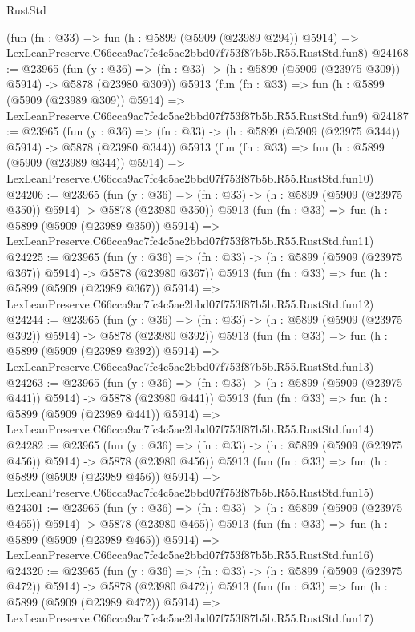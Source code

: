 \begin{lexlean}{RustStd}
\begin{coremodule}
{{    (fun (fn : @33) =>
    fun (h : @5899 (@5909 (@23989 @294)) @5914) =>
    LexLeanPreserve.C66cca9ac7fc4c5ae2bbd07f753f87b5b.R55.RustStd.fun8)
@24168 := @23965
    (fun (y : @36) => (fn : @33) -> (h : @5899 (@5909 (@23975 @309)) @5914) -> @5878 (@23980 @309))
    @5913
    (fun (fn : @33) =>
    fun (h : @5899 (@5909 (@23989 @309)) @5914) =>
    LexLeanPreserve.C66cca9ac7fc4c5ae2bbd07f753f87b5b.R55.RustStd.fun9)
@24187 := @23965
    (fun (y : @36) => (fn : @33) -> (h : @5899 (@5909 (@23975 @344)) @5914) -> @5878 (@23980 @344))
    @5913
    (fun (fn : @33) =>
    fun (h : @5899 (@5909 (@23989 @344)) @5914) =>
    LexLeanPreserve.C66cca9ac7fc4c5ae2bbd07f753f87b5b.R55.RustStd.fun10)
@24206 := @23965
    (fun (y : @36) => (fn : @33) -> (h : @5899 (@5909 (@23975 @350)) @5914) -> @5878 (@23980 @350))
    @5913
    (fun (fn : @33) =>
    fun (h : @5899 (@5909 (@23989 @350)) @5914) =>
    LexLeanPreserve.C66cca9ac7fc4c5ae2bbd07f753f87b5b.R55.RustStd.fun11)
@24225 := @23965
    (fun (y : @36) => (fn : @33) -> (h : @5899 (@5909 (@23975 @367)) @5914) -> @5878 (@23980 @367))
    @5913
    (fun (fn : @33) =>
    fun (h : @5899 (@5909 (@23989 @367)) @5914) =>
    LexLeanPreserve.C66cca9ac7fc4c5ae2bbd07f753f87b5b.R55.RustStd.fun12)
@24244 := @23965
    (fun (y : @36) => (fn : @33) -> (h : @5899 (@5909 (@23975 @392)) @5914) -> @5878 (@23980 @392))
    @5913
    (fun (fn : @33) =>
    fun (h : @5899 (@5909 (@23989 @392)) @5914) =>
    LexLeanPreserve.C66cca9ac7fc4c5ae2bbd07f753f87b5b.R55.RustStd.fun13)
@24263 := @23965
    (fun (y : @36) => (fn : @33) -> (h : @5899 (@5909 (@23975 @441)) @5914) -> @5878 (@23980 @441))
    @5913
    (fun (fn : @33) =>
    fun (h : @5899 (@5909 (@23989 @441)) @5914) =>
    LexLeanPreserve.C66cca9ac7fc4c5ae2bbd07f753f87b5b.R55.RustStd.fun14)
@24282 := @23965
    (fun (y : @36) => (fn : @33) -> (h : @5899 (@5909 (@23975 @456)) @5914) -> @5878 (@23980 @456))
    @5913
    (fun (fn : @33) =>
    fun (h : @5899 (@5909 (@23989 @456)) @5914) =>
    LexLeanPreserve.C66cca9ac7fc4c5ae2bbd07f753f87b5b.R55.RustStd.fun15)
@24301 := @23965
    (fun (y : @36) => (fn : @33) -> (h : @5899 (@5909 (@23975 @465)) @5914) -> @5878 (@23980 @465))
    @5913
    (fun (fn : @33) =>
    fun (h : @5899 (@5909 (@23989 @465)) @5914) =>
    LexLeanPreserve.C66cca9ac7fc4c5ae2bbd07f753f87b5b.R55.RustStd.fun16)
@24320 := @23965
    (fun (y : @36) => (fn : @33) -> (h : @5899 (@5909 (@23975 @472)) @5914) -> @5878 (@23980 @472))
    @5913
    (fun (fn : @33) =>
    fun (h : @5899 (@5909 (@23989 @472)) @5914) =>
    LexLeanPreserve.C66cca9ac7fc4c5ae2bbd07f753f87b5b.R55.RustStd.fun17)
}}
\end{coremodule}
\end{lexlean}
